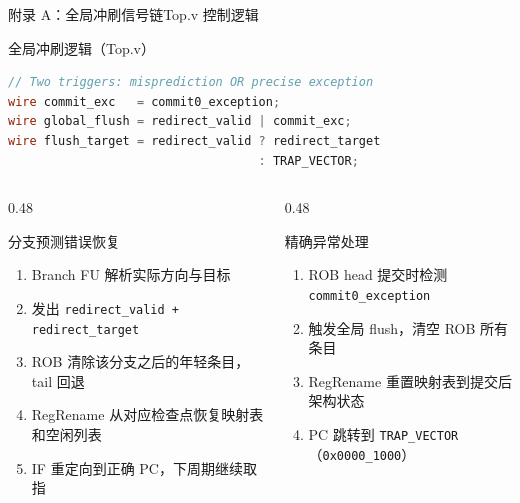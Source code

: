 \documentclass[aspectratio=169,xcolor={dvipsnames,svgnames},10pt]{beamer}
\newcommand{\code}[1]{\texttt{\small\color{PrimaryBlue}#1}}
\begin{document}
\begin{frame}[fragile,shrink=6]{附录 A：全局冲刷信号链}{Top.v 控制逻辑}
  \begin{block}{全局冲刷逻辑（Top.v）}
\begin{lstlisting}[language=Verilog]
// Two triggers: misprediction OR precise exception
wire commit_exc   = commit0_exception;
wire global_flush = redirect_valid | commit_exc;
wire flush_target = redirect_valid ? redirect_target
                                   : TRAP_VECTOR;
\end{lstlisting}
  \end{block}
  \vspace{0.2cm}
  \begin{columns}[T]
    \begin{column}{0.48\textwidth}
      \begin{block}{分支预测错误恢复}
        \small
        \begin{enumerate}
          \item Branch FU 解析实际方向与目标
          \item 发出 \code{redirect\_valid + redirect\_target}
          \item ROB 清除该分支之后的年轻条目，tail 回退
          \item RegRename 从对应检查点恢复映射表和空闲列表
          \item IF 重定向到正确 PC，下周期继续取指
        \end{enumerate}
      \end{block}
    \end{column}
    \begin{column}{0.48\textwidth}
      \begin{block}{精确异常处理}
        \small
        \begin{enumerate}
          \item ROB head 提交时检测 \code{commit0\_exception}
          \item 触发全局 flush，清空 ROB 所有条目
          \item RegRename 重置映射表到提交后架构状态
          \item PC 跳转到 \code{TRAP\_VECTOR}（\code{0x0000\_1000}）
        \end{enumerate}
      \end{block}
    \end{column}
  \end{columns}
\end{frame}
\end{document}
